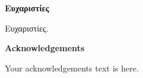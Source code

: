 \clearpage
\thispagestyle{plain}

\vspace*{\fill}
\begin{center}
  \vspace{-4cm} %
  \textbf{Ευχαριστίες}
  
  \vspace{1.5em} %
  \parbox{0.75\textwidth}
  {%
    Ευχαριστίες.
  }
\end{center}
\vspace*{\fill}


\newpage

\clearpage
\thispagestyle{plain}

\vspace*{\fill}
\begin{center}
    \vspace{-4cm} %
    \textbf{Acknowledgements}
  
    \vspace{1.5em} %
    \parbox{0.75\textwidth}
    {%
        Your acknowledgements text is here.
    }
\end{center}
\vspace*{\fill}